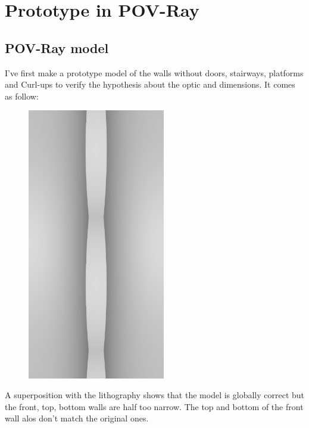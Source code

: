 \documentclass[12pt, a4paper]{article}
\begin{document}
\section{Prototype in POV-Ray}

\subsection{POV-Ray model}

I've first make a prototype model of the walls without doors, stairways, platforms and Curl-ups to verify the hypothesis about the optic and dimensions. It comes as follow:\\

\begin{scriptsize}
\begin{ttfamily}

\end{ttfamily}
\end{scriptsize}

\begin{center}
\begin{figure}[H]
\centering\includegraphics[width=6cm]{./XL-51_1.png}\\
\end{figure}
\end{center}

A superposition with the lithography shows that the model is globally correct but the front, top, bottom walls are half too narrow. The top and bottom of the front wall alos don't match the original ones.\\
\end{document}
